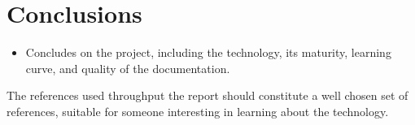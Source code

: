 \section{Conclusions}

\begin{itemize}
   \item Concludes on the project, including the technology, its maturity,
   learning curve, and quality of the documentation.   
\end{itemize}

The references used throughput the report should constitute a well
chosen set of references, suitable for someone interesting in learning
about the technology.

